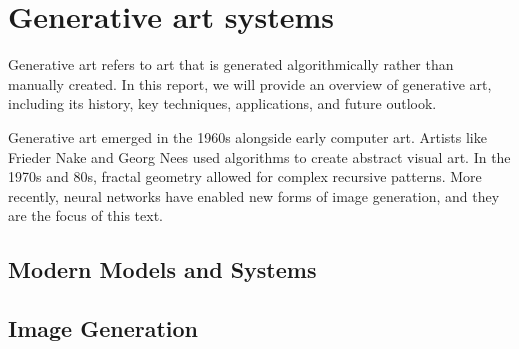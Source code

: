 \section{Generative art systems}
Generative art refers to art that is generated algorithmically rather than manually created. In this report, we will provide an overview of generative art, including its history, key techniques, applications, and future outlook. \par 
Generative art emerged in the 1960s alongside early computer art. Artists like Frieder Nake and Georg Nees used algorithms to create abstract visual art. In the 1970s and 80s, fractal geometry allowed for complex recursive patterns. More recently, neural networks have enabled new forms of image generation, and they are the focus of this text.
\subsection{Modern Models and Systems}

\subsection{Image Generation}

